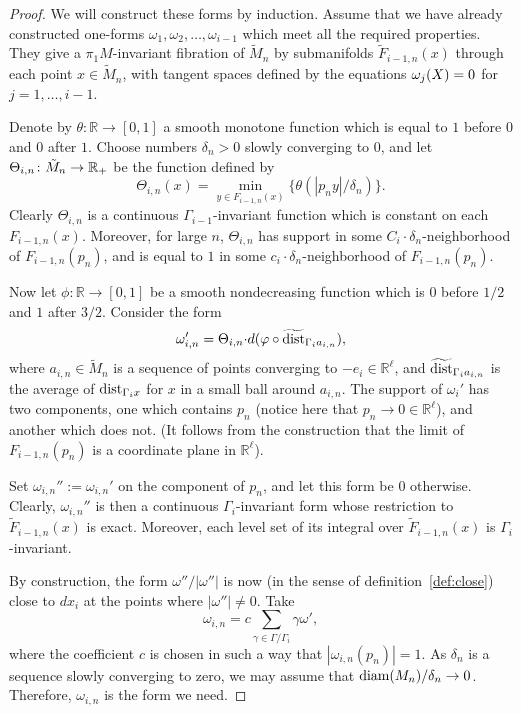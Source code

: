 \documentclass{amsart}
\begin{document}
\begin{proof}
We will construct these forms by induction.
Assume that we have already constructed one-forms
$\omega_1,\omega_2,\ldots, \omega_{i-1}$
which meet all the required properties.
They give a $\pi_1M$-invariant fibration of $\tilde M_n$ by submanifolds
$\tilde F_{i-1,n}(x)$ through each point $x\in \tilde M_n$, with
tangent spaces defined by the equations $\omega_j(X)\z=0$ for $j=1,\ldots,i-1$.

Denote by $\theta\colon \mathbb{R}\to [0,1]$
a smooth monotone function
which is equal to $1$ before $0$ and $0$ after $1$.
Choose numbers $\delta_n>0$ slowly converging to $0$,
and let $\Theta_{i,n}\colon \tilde M_n\z\to \mathbb{R}_+$ be the function defined by
$$\Theta_{i,n}(x)
=\min_{y\in F_{i-1,n}(x)}\{\theta(|p_n y|/\delta_n)\}.$$
Clearly $\Theta_{i,n}$ is a continuous $\Gamma_{i-1}$-invariant function
which is constant on each $F_{i-1,n}(x)$.
Moreover, for large $n$,
$\Theta_{i,n}$ has support in  some $C_i{\cdot} \delta_n$-neighborhood
of $F_{i-1,n}(p_n)$, and is equal to $1$
in some $c_i{\cdot} \delta_n$-neighborhood of $F_{i-1,n}(p_n)$.

Now let $\phi\colon \mathbb{R}\to [0,1]$
be a smooth nondecreasing function
which is $0$ before $1/2$ and $1$ after $3/2$.
Consider the form
$$\omega_{i,n}'=\Theta_{i,n}{\cdot} d(\varphi\circ \widetilde{\operatorname{\rm dist}}_{\Gamma_{i}a_{i,n}}),$$
where $a_{i,n}\in \tilde M_n$ is a sequence of points
converging to $ -e_i\in \mathbb{R}^\ell$,
and $\widetilde{\operatorname{\rm dist}}_{\Gamma_{i}a_{i,n}}$ is the
average of $\operatorname{\rm dist}_{\Gamma_{i}x}$ for $x$ in a small ball around $a_{i,n}$.
The support of $\omega_i'$ has two components,
one which  contains $ p_n$ (notice here that $p_n\to 0\in \mathbb{R}^\ell$),
and another which does not.
(It follows from the construction
that  the limit of $F_{i-1,n}(p_n)$ is a coordinate plane  in $\mathbb{R}^\ell$).

Set $\omega_{i,n}'':=\omega_{i,n}'$ on the component of $ p_n$,
and let this form be $0$ otherwise.
Clearly, $\omega_{i,n}''$ is then a continuous $\Gamma_{i}$-invariant form
whose restriction to ${\tilde F_{i-1,n}(x)}$ is exact.
Moreover, each level set of its integral over
${\tilde F_{i-1,n}(x)}$ is $\Gamma_{i}$-invariant.

By construction, the form $\omega''/|\omega''|$ is now
 (in the sense of definition~\ref{def:close})
close to $dx_i$  at the points where
$|\omega''|\not=0$.
Take
$$\omega_{i,n}=c\sum_{\gamma\in \Gamma/\Gamma_i} \gamma\omega',$$
where the coefficient $c$ is chosen in such a way that  $|\omega_{i,n}(p_n)|=1$.
As $\delta_n$ is a sequence slowly converging to zero,
we may assume that $\operatorname{\rm diam} (M_n)/\delta_n\to 0$.
Therefore, $\omega_{i,n}$ is the form we need.
\end{proof}
\end{document}
